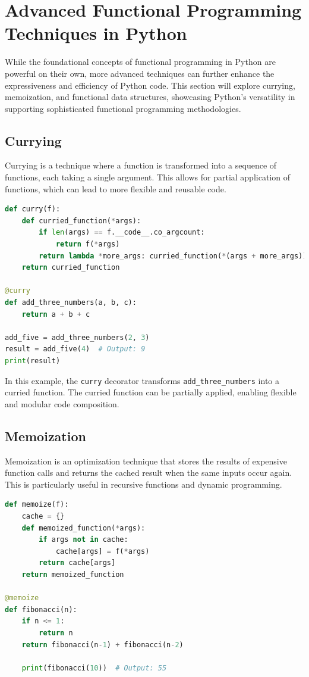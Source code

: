 \documentclass[a4paper]{article}
\begin{document}
\newpage
\section{Advanced Functional Programming Techniques in Python}
While the foundational concepts of functional programming in Python are powerful on their own, more advanced techniques can further enhance the expressiveness and efficiency of Python code. This section will explore currying, memoization, and functional data structures, showcasing Python's versatility in supporting sophisticated functional programming methodologies.

\subsection{Currying}
Currying is a technique where a function is transformed into a sequence of functions, each taking a single argument. This allows for partial application of functions, which can lead to more flexible and reusable code.

\begin{lstlisting}[language=Python, caption=Currying Example]
def curry(f):
    def curried_function(*args):
        if len(args) == f.__code__.co_argcount:
            return f(*args)
        return lambda *more_args: curried_function(*(args + more_args))
    return curried_function

@curry
def add_three_numbers(a, b, c):
    return a + b + c

add_five = add_three_numbers(2, 3)
result = add_five(4)  # Output: 9
print(result)
\end{lstlisting}

In this example, the \texttt{curry} decorator transforms \texttt{add\_three\_numbers} into a curried function. The curried function can be partially applied, enabling flexible and modular code composition.

\subsection{Memoization}
Memoization is an optimization technique that stores the results of expensive function calls and returns the cached result when the same inputs occur again. This is particularly useful in recursive functions and dynamic programming.

\begin{lstlisting}[language=Python, caption=Memoization Example]
def memoize(f):
    cache = {}
    def memoized_function(*args):
        if args not in cache:
            cache[args] = f(*args)
        return cache[args]
    return memoized_function

@memoize
def fibonacci(n):
    if n <= 1:
        return n
    return fibonacci(n-1) + fibonacci(n-2)

    print(fibonacci(10))  # Output: 55
\end{lstlisting}
\end{document}
